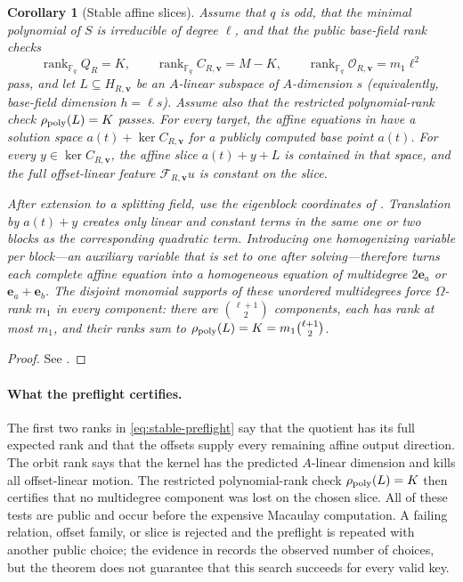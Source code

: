\documentclass[11pt]{article}
\newtheorem{corollary}[corollary]{Corollary}
\newcommand{\F}{\mathbb F}
\newcommand{\rank}{\operatorname{rank}}
\begin{document}
\begin{corollary}[Stable affine slices]\label{cor:stable-slices}
Assume that $q$ is odd, that the minimal polynomial of $S$ is irreducible of
degree $\ell$, and that the public base-field rank checks
\begin{equation}\label{eq:stable-preflight}
 \rank_{\F_q} Q_R=K,\qquad
 \rank_{\F_q} C_{R,\mathbf v}=M-K,\qquad
 \rank_{\F_q}\mathcal O_{R,\mathbf v}=m_1\ell^2
\end{equation}
pass, and let $L\subseteq H_{R,\mathbf v}$ be an $A$-linear subspace of
$A$-dimension $s$ (equivalently, base-field dimension $h=\ell s$).  Assume
also that the restricted polynomial-rank check
$\rho_{\rm poly}(L)=K$ passes.  For every
target, the affine equations in  have a
solution space $a(t)+\ker C_{R,\mathbf v}$ for a publicly computed base point
$a(t)$.  For every $y\in\ker C_{R,\mathbf v}$, the affine
slice $a(t)+y+L$ is contained in that space, and the full offset-linear feature
$\mathcal F_{R,\mathbf v}u$ is constant on the slice.

After extension to a splitting field, use the eigenblock coordinates of
.  Translation by $a(t)+y$ creates only linear and
constant terms in the same one or two blocks as the corresponding quadratic
term.  Introducing one homogenizing variable per block---an auxiliary variable that
is set to one after solving---therefore turns each complete affine equation
into a homogeneous equation of multidegree
$2\mathbf e_a$ or $\mathbf e_a+\mathbf e_b$.  The disjoint monomial supports
of these unordered multidegrees force $\Omega$-rank $m_1$ in every component:
there are
$\binom{\ell+1}{2}$ components, each has rank at most $m_1$, and their ranks
sum to $\rho_{\rm poly}(L)=K=m_1\binom{\ell+1}{2}$.
\end{corollary}

\begin{proof}
See .
\end{proof}

\paragraph{What the preflight certifies.}
The first two ranks in \eqref{eq:stable-preflight} say that the quotient has
its full expected rank and that the offsets supply every remaining affine
output direction.  The orbit rank says that the kernel has the predicted
$A$-linear dimension and kills all offset-linear motion.  The restricted
polynomial-rank check $\rho_{\rm poly}(L)=K$ then certifies that no
multidegree component was lost on the chosen slice.  All of these tests are
public and occur before the expensive Macaulay computation.  A failing
relation, offset family, or slice is rejected and the preflight is repeated
with another public choice; the evidence in  records the
observed number of choices, but the theorem does not guarantee that this
search succeeds for every valid key.
\end{document}
